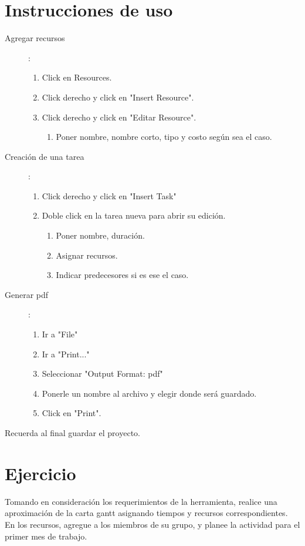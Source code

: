 \documentclass[letter, 10pt]{article}
\begin{document}
\section{Instrucciones de uso}
\begin{description}
    \item[Agregar recursos]:
\begin{enumerate}
    \item Click en Resources.
    \item Click derecho y click en "Insert Resource".
    \item Click derecho y click en "Editar Resource".
    \begin{enumerate}
        \item Poner nombre, nombre corto, tipo y costo según sea el caso.
    \end{enumerate}
\end{enumerate}

    \item[Creación de una tarea]:
\begin{enumerate}
    \item Click derecho y click en "Insert Task"
    \item Doble click en la tarea nueva para abrir su edición.
    \begin{enumerate}
        \item Poner nombre, duración.
        \item Asignar recursos.
        \item Indicar predecesores si es ese el caso.
    \end{enumerate}
\end{enumerate}

    \item[Generar pdf]:
\begin{enumerate}
    \item Ir a "File"
    \item Ir a "Print..."
    \item Seleccionar "Output Format: pdf"
    \item Ponerle un nombre al archivo y elegir donde será guardado.
    \item Click en "Print".
\end{enumerate}
    

\item[Recuerda al final guardar el proyecto.]

\end{description}

\section{Ejercicio}
Tomando en consideración los requerimientos de la herramienta, realice una
aproximación de la carta gantt asignando tiempos y recursos correspondientes.
En los recursos, agregue a los miembros de su grupo, y planee la actividad
para el primer mes de trabajo.
\end{document}
